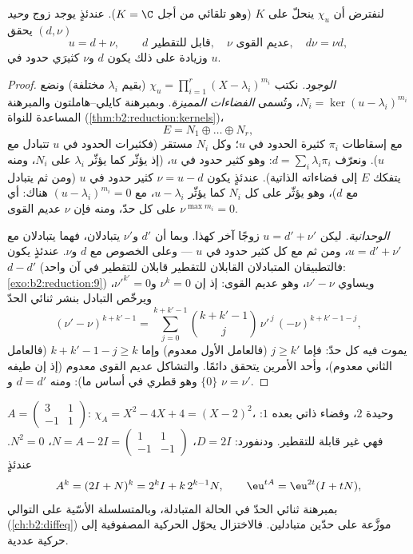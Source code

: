\begin{theorem}\label{thm:b2:reduction:dunford}
لنفترض أن $\chi_u$ ينحلّ على $K$ (وهو تلقائي من أجل $K = \C$). عندئذٍ
يوجد زوج \emph{وحيد} $(d, \nu)$ يحقق
\[
u = d + \nu, \qquad d \text{ قابل للتقطير}, \quad \nu
\text{ عديم القوى}, \quad d\nu = \nu d ,
\]
وزيادة على ذلك يكون $d$ و$\nu$ كثيرَي حدود في
$u$.
\end{theorem}

\begin{proof}
\emph{الوجود.} نكتب $\chi_u = \prod_{i=1}^{r} (X -
\lambda_i)^{m_i}$ (بقيم $\lambda_i$ مختلفة) ونضع $N_i = \ker(u -
\lambda_i)^{m_i}$، وتُسمى \emph{الفضاءات المميزة}. وبمبرهنة
كايلي--هاملتون والمبرهنة المساعدة للنواة
(\cref{thm:b2:reduction:kernels})،
\[
E = N_1 \oplus \dots \oplus N_r ,
\]
مع إسقاطات $\pi_i$ كثيرة الحدود في $u$؛ وكل $N_i$ مستقر
(فكثيرات الحدود في $u$ تتبادل مع $u$). ونعرّف $d = \sum_i \lambda_i
\pi_i$: وهو كثير حدود في $u$،  (إذ يؤثّر كما يؤثّر $\lambda_i$
على $N_i$، ومنه يتفكك $E$ إلى فضاءاته الذاتية). عندئذٍ يكون $\nu = u -
d$ كثير حدود في $u$ (ومن ثم يتبادل مع $d$)، وهو يؤثّر على كل
$N_i$ كما يؤثّر $u - \lambda_i$، مع $(u - \lambda_i)^{m_i} = 0$
هناك: أي $\nu^{\max m_i} = 0$ على كل حدّ، ومنه فإن $\nu$ عديم القوى.

\emph{الوحدانية.} ليكن $u = d' + \nu'$ زوجًا آخر كهذا. وبما أن
$d'$ و$\nu'$ يتبادلان، فهما يتبادلان مع $u = d' +
\nu'$، ومن ثم مع كل كثير حدود في $u$ --- وعلى الخصوص مع $d$
و$\nu$. عندئذٍ يكون $d - d'$  (فالتطبيقان المتبادلان
القابلان للتقطير قابلان للتقطير في آن واحد:
\cref{exo:b2:reduction:9}) ويساوي $\nu' - \nu$، وهو
عديم القوى: إذ إن $\nu^k = 0$ و$\nu'^{k'} = 0$، ويرخّص التبادل
بنشر ثنائي الحدّ
\[
(\nu' - \nu)^{k + k' - 1}
= \sum_{j=0}^{k+k'-1}\binom{k + k' - 1}{j}
\,\nu'^{\,j}\,(-\nu)^{k + k' - 1 - j} ,
\]
يموت فيه كل حدّ: فإما $j \geq k'$ (فالعامل الأول
معدوم) وإما $k + k' - 1 - j \geq k$ (فالعامل الثاني معدوم)، وأحد
الأمرين يتحقق دائمًا. والتشاكل عديم القوى  معدوم (إذ إن
طيفه $\{0\}$ وهو قطري في أساس ما): ومنه $d = d'$ و
$\nu = \nu'$.
\end{proof}

\begin{example}\label{ex:b2:reduction:powers}
$A = \begin{pmatrix} 3 & 1\\ -1 & 1\end{pmatrix}$: $\chi_A = X^2 -
4X + 4 = (X-2)^2$،  وحيدة $2$، وفضاء ذاتي بعده
$1$: فهي غير قابلة للتقطير. ودنفورد: $D = 2I$، $N = A - 2I =
\begin{pmatrix} 1 & 1\\ -1 & -1\end{pmatrix}$، $N^2 = 0$. عندئذٍ
\[
A^k = (2I + N)^k = 2^k I + k\,2^{k-1} N ,
\qquad
\eu^{tA} = \eu^{2t}(I + tN),
\]
بمبرهنة ثنائي الحدّ في الحالة المتبادلة، وبالمتسلسلة الأسّية على التوالي
(\cref{ch:b2:diffeq}) موزَّعة على حدّين متبادلين. فالاختزال يحوّل
الحركية المصفوفية إلى حركية عددية.
\end{example}

